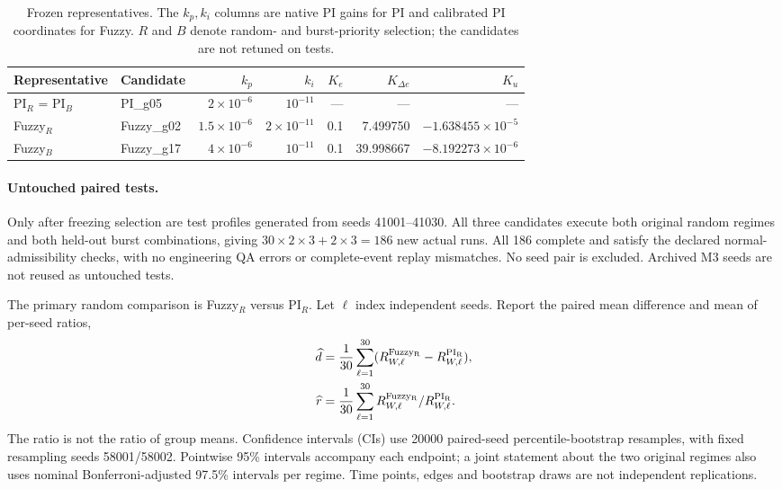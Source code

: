 \begin{table}[t]
\caption{Frozen representatives. The $k_p,k_i$ columns are native PI gains
for PI and calibrated PI coordinates for Fuzzy. $R$ and $B$ denote
random- and burst-priority selection; the candidates are not retuned on tests.}
\label{tab:eval_selected_gains}
\centering
\begin{tabular}{@{}llrrrrr@{}}\toprule
Representative & Candidate & $k_p$ & $k_i$ & $K_e$ & $K_{\Delta e}$ & $K_u$\\\midrule
PI$_R$ = PI$_B$ & PI\_g05 & $2\times10^{-6}$ & $10^{-11}$ & --- & --- & ---\\
Fuzzy$_R$ & Fuzzy\_g02 & $1.5\times10^{-6}$ & $2\times10^{-11}$ & 0.1 & 7.499750 & $-1.638455\times10^{-5}$\\
Fuzzy$_B$ & Fuzzy\_g17 & $4\times10^{-6}$ & $10^{-11}$ & 0.1 & 39.998667 & $-8.192273\times10^{-6}$\\\bottomrule
\end{tabular}
\end{table}

\paragraph{Untouched paired tests.}
Only after freezing selection are test profiles generated from seeds
41001--41030. All three candidates execute both original random
regimes and both held-out burst combinations, giving
$30\times2\times3+2\times3=186$ new actual runs. All 186 complete
and satisfy the declared normal-admissibility checks, with no
engineering QA errors or complete-event replay mismatches. No seed
pair is excluded. Archived M3 seeds are not reused as untouched tests.

The primary random comparison is Fuzzy$_R$ versus PI$_R$. Let $\ell$
index independent seeds. Report the paired mean difference and mean
of per-seed ratios,
\begin{align}
 \widehat d&=\frac1{30}\sum_{\ell=1}^{30}
       (R_{W,\ell}^{\rm Fuzzy_R}-R_{W,\ell}^{\rm PI_R}),\nonumber\\
 \widehat r&=\frac1{30}\sum_{\ell=1}^{30}
       R_{W,\ell}^{\rm Fuzzy_R}/R_{W,\ell}^{\rm PI_R}.
 \label{eq:eval_paired_ratio}
\end{align}
The ratio is not the ratio of group means. Confidence intervals (CIs)
use 20000 paired-seed percentile-bootstrap resamples, with fixed
resampling seeds 58001/58002. Pointwise 95\% intervals accompany
each endpoint; a joint statement about the two original regimes also
uses nominal Bonferroni-adjusted 97.5\% intervals per regime.
Time points, edges and bootstrap draws are not independent replications.

